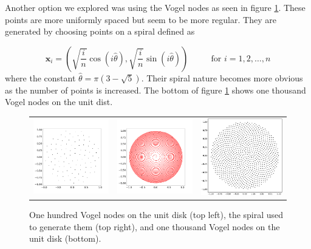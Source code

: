 \documentclass[12pt]{article}
\let\vec\mathbf
\begin{document}
Another option we explored was using the Vogel nodes as seen in figure \ref{vogel}. These points are more uniformly spaced but seem to be more regular. They are generated by choosing points on a spiral defined as

$$
\vec{x}_i = \left( \sqrt{\frac{i}{n}}\cos(i\hat{\theta}), \sqrt{\frac{i}{n}}\sin(i\hat{\theta})  \right) \phantom{==}\text{for } i = 1, 2, \dots, n
$$
where the constant $\hat{\theta} = \pi (3-\sqrt{5})$. Their spiral nature becomes more obvious as the number of points is increased. The bottom of figure \ref{vogel} shows one thousand Vogel nodes on the unit dist.

\begin{figure}[ht]
	\centering
	\begin{tabular}{ccc}
		\includegraphics[width=.3\textwidth]{vogel_no_spiral.png} & \includegraphics[width=.3\textwidth]{vogel_spiral.png} &
		\includegraphics[width=.3\textwidth]{vogel_1000_disk.eps} 
	\end{tabular}
	\caption{One hundred Vogel nodes on the unit disk (top left), the spiral used to generate them (top right), and one thousand Vogel nodes on the unit disk (bottom).}
	\label{vogel}
\end{figure}
\end{document}
